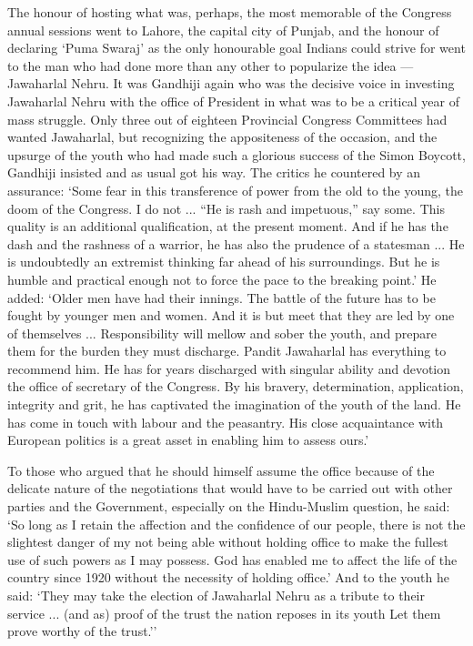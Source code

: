 The honour of hosting what was, perhaps, the most memorable of the Congress annual sessions went to Lahore, the capital city of Punjab, and the honour of declaring `Puma Swaraj' as the only honourable goal Indians could strive for went to the man who had done more than any other to popularize the idea --- Jawaharlal Nehru. It was Gandhiji again who was the decisive voice in investing Jawaharlal Nehru with the office of President in what was to be a critical year of mass struggle. Only three out of eighteen Provincial Congress Committees had wanted Jawaharlal, but recognizing the appositeness of the occasion, and the upsurge of the youth who had made such a glorious success of the Simon Boycott, Gandhiji insisted and as usual got his way. The critics he countered by an assurance: `Some fear in this transference of power from the old to the young, the doom of the Congress. I do not ... ``He is rash and impetuous,'' say some. This quality is an additional qualification, at the present moment. And if he has the dash and the rashness of a warrior, he has also the prudence of a statesman ... He is undoubtedly an extremist thinking far ahead of his surroundings. But he is humble and practical enough not to force the pace to the breaking point.' He added: `Older men have had their innings. The battle of the future has to be fought by younger men and women. And it is but meet that they are led by one of themselves ... Responsibility will mellow and sober the youth, and prepare them for the burden they must discharge. Pandit Jawaharlal has everything to recommend him. He has for years discharged with singular ability and devotion the office of secretary of the Congress. By his bravery, determination, application, integrity and grit, he has captivated the imagination of the youth of the land. He has come in touch with labour and the peasantry. His close acquaintance with European politics is a great asset in enabling him to assess ours.' 

To those who argued that he should himself assume the office because of the delicate nature of the negotiations that would have to be carried out with other parties and the Government, especially on the Hindu-Muslim question, he said: `So long as I retain the affection and the confidence of our people, there is not the slightest danger of my not being able without holding office to make the fullest use of such powers as I may possess. God has enabled me to affect the life of the country since 1920 without the necessity of holding office.' And to the youth he said: `They may take the election of Jawaharlal Nehru as a tribute to their service ... (and as) proof of the trust the nation reposes in its youth Let them prove worthy of the trust.'' 

